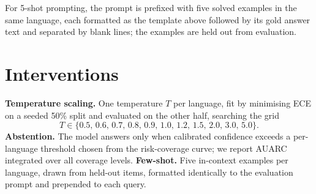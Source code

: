 \documentclass[11pt]{article}
\begin{document}
For 5-shot prompting, the prompt is prefixed with five solved examples in the same language, each
formatted as the template above followed by its gold answer text and separated by blank lines; the
examples are held out from evaluation.

\section{Interventions}\label{app:interventions}
\textbf{Temperature scaling.} One temperature $T$ per language, fit by minimising ECE on a seeded
50\% split and evaluated on the other half, searching the grid
\[
T \in \{0.5,\, 0.6,\, 0.7,\, 0.8,\, 0.9,\, 1.0,\, 1.2,\, 1.5,\, 2.0,\, 3.0,\, 5.0\}.
\]
\textbf{Abstention.} The model answers only when calibrated confidence exceeds a per-language
threshold chosen from the risk-coverage curve; we report AUARC integrated over all coverage levels.
\textbf{Few-shot.} Five in-context examples per language, drawn from held-out items, formatted
identically to the evaluation prompt and prepended to each query.
\end{document}
